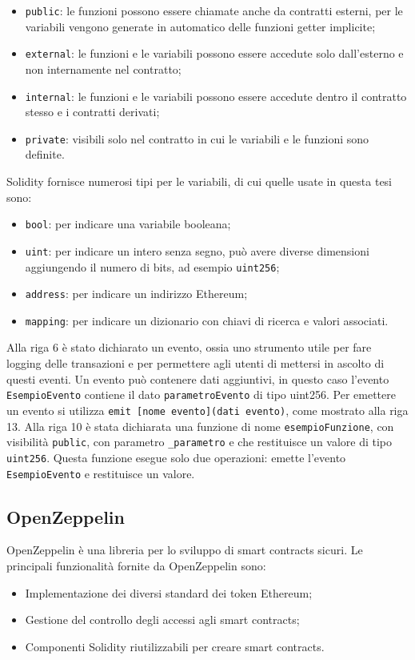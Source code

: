 \documentclass[a4paper]{article}
\begin{document}
      \begin{itemize}
        \item \verb|public|: le funzioni possono essere chiamate anche da contratti esterni, per le variabili vengono generate in automatico delle funzioni getter implicite;
        \item \verb|external|: le funzioni e le variabili possono essere accedute solo dall'esterno e non internamente nel contratto;
        \item \verb|internal|: le funzioni e le variabili possono essere accedute dentro il contratto stesso e i contratti derivati;
        \item \verb|private|: visibili solo nel contratto in cui le variabili e le funzioni sono definite\cite{solidityvisibility}.
      \end{itemize}
      Solidity fornisce numerosi tipi per le variabili, di cui quelle usate in questa tesi sono:
      \begin{itemize}
        \item \verb|bool|: per indicare una variabile booleana;
        \item \verb|uint|: per indicare un intero senza segno, può avere diverse dimensioni aggiungendo il numero di bits, ad esempio \verb|uint256|;
        \item \verb|address|: per indicare un indirizzo Ethereum;
        \item \verb|mapping|: per indicare un dizionario con chiavi di ricerca e valori associati\cite{soliditytypes}.
      \end{itemize}
      Alla riga 6 è stato dichiarato un evento, ossia uno strumento utile per fare logging delle transazioni e per permettere agli utenti di mettersi in ascolto di questi eventi.
      Un evento può contenere dati aggiuntivi, in questo caso l'evento \verb|EsempioEvento| contiene il dato \verb|parametroEvento| di tipo uint256.
      Per emettere un evento si utilizza \verb|emit [nome evento](dati evento)|, come mostrato alla riga 13.
      \newline
      Alla riga 10 è stata dichiarata una funzione di nome \verb|esempioFunzione|, con visibilità \verb|public|, con parametro \verb|_parametro| e che restituisce un valore di tipo \verb|uint256|.
      Questa funzione esegue solo due operazioni: emette l'evento \verb|EsempioEvento| e restituisce un valore. 

    \subsection{OpenZeppelin}
    OpenZeppelin è una libreria per lo sviluppo di smart contracts sicuri. Le principali funzionalità fornite da OpenZeppelin sono:
    \begin{itemize}
    \item Implementazione dei diversi standard dei token Ethereum;
    \item Gestione del controllo degli accessi agli smart contracts;
    \item Componenti Solidity riutilizzabili per creare smart contracts\cite{openzeppelin}.
    \end{itemize}
\end{document}
